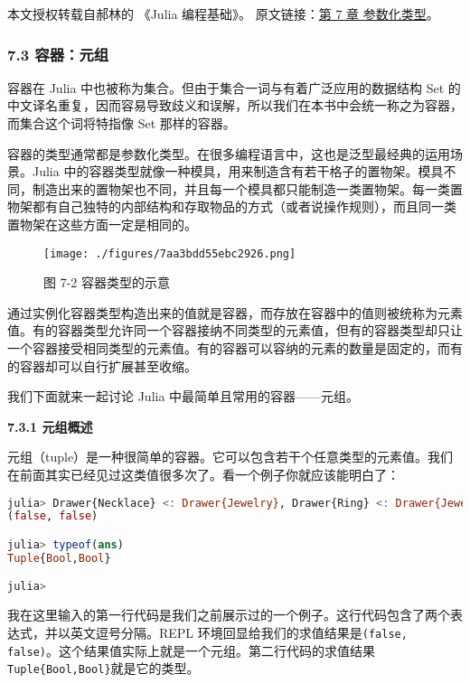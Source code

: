 
本文授权转载自郝林的 《Julia 编程基础》。 原文链接：\href{https://github.com/hyper0x/JuliaBasics/blob/master/book/ch07.md}{第 7 章 参数化类型}。


\subsubsection{7.3 容器：元组}

容器在 Julia 中也被称为集合。但由于集合一词与有着广泛应用的数据结构 Set 的中文译名重复，因而容易导致歧义和误解，所以我们在本书中会统一称之为容器，而集合这个词将特指像 Set 那样的容器。

容器的类型通常都是参数化类型。在很多编程语言中，这也是泛型最经典的运用场景。Julia 中的容器类型就像一种模具，用来制造含有若干格子的置物架。模具不同，制造出来的置物架也不同，并且每一个模具都只能制造一类置物架。每一类置物架都有自己独特的内部结构和存取物品的方式（或者说操作规则），而且同一类置物架在这些方面一定是相同的。
\begin{figure}[ht]
\centering
\texttt{[image: ./figures/7aa3bdd55ebc2926.png]}
\caption{图 7-2 容器类型的示意} \label{fig_JuC7S3_1}
\end{figure}

通过实例化容器类型构造出来的值就是容器，而存放在容器中的值则被统称为元素值。有的容器类型允许同一个容器接纳不同类型的元素值，但有的容器类型却只让一个容器接受相同类型的元素值。有的容器可以容纳的元素的数量是固定的，而有的容器却可以自行扩展甚至收缩。

我们下面就来一起讨论 Julia 中最简单且常用的容器——元组。

\textbf{7.3.1 元组概述 }

元组（tuple）是一种很简单的容器。它可以包含若干个任意类型的元素值。我们在前面其实已经见过这类值很多次了。看一个例子你就应该能明白了：
\begin{lstlisting}[language=julia]
julia> Drawer{Necklace} <: Drawer{Jewelry}, Drawer{Ring} <: Drawer{Jewelry}
(false, false)

julia> typeof(ans)
Tuple{Bool,Bool}

julia> 
\end{lstlisting}

我在这里输入的第一行代码是我们之前展示过的一个例子。这行代码包含了两个表达式，并以英文逗号分隔。REPL 环境回显给我们的求值结果是\verb|(false, false)|。这个结果值实际上就是一个元组。第二行代码的求值结果\verb|Tuple{Bool,Bool}|就是它的类型。

